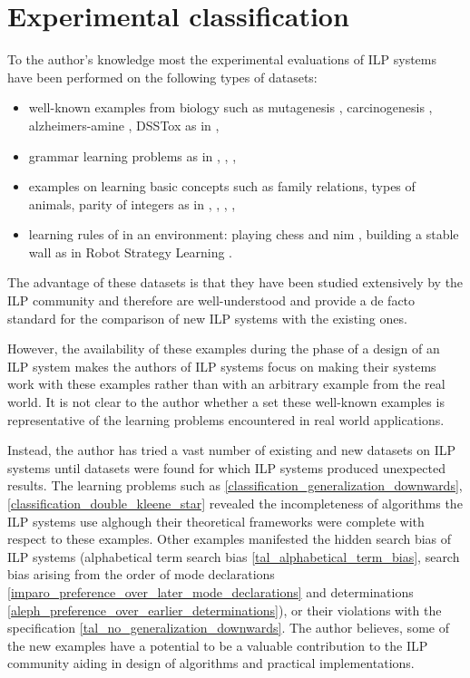 \section{Experimental classification}
To the author's knowledge most the experimental evaluations of ILP systems have been performed on the following types of datasets:
\begin{itemize}
\item well-known examples from biology such as mutagenesis \cite{srinivasan1994mutagenesis}, carcinogenesis \cite{srinivasan1997carcinogenesis}, alzheimers-amine \cite{king1995relating}, DSSTox \cite{richard2002distributed} as in \cite{muggleton2008toplog}\cite{corapi2011nonmonotonic},
\item grammar learning problems as in \cite{muggleton1999progolWebsite} \cite{muggleton2012mc}, \cite{muggleton2013meta}, \cite{kimber2012learning},
\item examples on learning basic concepts such as family relations, types of animals, parity of integers as in \cite{muggleton1999progolWebsite}, \cite{santos2008toplogWebsite}, \cite{corapi2011tal}, \cite{aleph2007},
\item learning rules of in an environment: playing chess and nim \cite{muggleton1999progolWebsite}, building a stable wall as in Robot Strategy Learning \cite{muggleton2014meta}.
\end{itemize}

The advantage of these datasets is that they have been studied extensively by the ILP community and therefore are well-understood and provide a de facto standard for the comparison of new ILP systems with the existing ones.

However, the availability of these examples during the phase of a design of an ILP system makes the authors of ILP systems focus on making their systems work with these examples rather than with an arbitrary example from the real world. It is not clear to the author whether a set these well-known examples is representative of the learning problems encountered in real world applications.

Instead, the author has tried a vast number of existing and new datasets on ILP systems until datasets were found for which ILP systems produced unexpected results. The learning problems such as \ref{classification_generalization_downwards}, \ref{classification_double_kleene_star} revealed the incompleteness of algorithms the ILP systems use alghough their theoretical frameworks were complete with respect to these examples. Other examples manifested the hidden search bias of ILP systems (alphabetical term search bias \ref{tal_alphabetical_term_bias}, search bias arising from the order of mode declarations \ref{imparo_preference_over_later_mode_declarations} and determinations \ref{aleph_preference_over_earlier_determinations}), or their violations with the specification \ref{tal_no_generalization_downwards}. The author believes, some of the new examples have a potential to be a valuable contribution to the ILP community aiding in design of algorithms and practical implementations.

